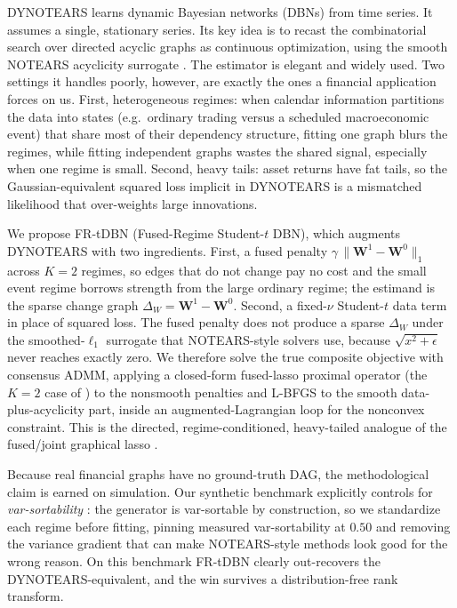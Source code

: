 \documentclass{article}
\newcommand{\W}{\bm{W}}
\newcommand{\Wd}{\Delta_{\!W}}
\begin{document}
DYNOTEARS \citep{pamfil2020dynotears} learns dynamic Bayesian networks (DBNs) from
time series. It assumes a single, stationary series. Its key idea is to recast the
combinatorial search over directed acyclic graphs as continuous optimization, using
the smooth NOTEARS acyclicity surrogate \citep{zheng2018notears}. The estimator is
elegant and widely used. Two settings it handles poorly, however, are exactly the
ones a financial application forces on us. First, heterogeneous regimes: when
calendar information partitions the data into states (e.g.\ ordinary trading versus
a scheduled macroeconomic event) that share most of their dependency structure,
fitting one graph blurs the regimes, while fitting independent graphs wastes the
shared signal, especially when one regime is small. Second, heavy tails: asset
returns have fat tails, so the Gaussian-equivalent squared loss implicit in
DYNOTEARS is a mismatched likelihood that over-weights large innovations.

We propose FR-tDBN (Fused-Regime Student-$t$ DBN), which augments DYNOTEARS with two
ingredients. First, a fused penalty $\gamma\,\|\W^{1}-\W^{0}\|_1$ across $K{=}2$
regimes, so edges that do not change pay no cost and the small event regime borrows
strength from the large ordinary regime; the estimand is the sparse change graph
$\Wd=\W^{1}-\W^{0}$. Second, a fixed-$\nu$ Student-$t$ data term in place of squared
loss. The fused penalty does not produce a sparse $\Wd$ under the smoothed-$\ell_1$
surrogate that NOTEARS-style solvers use, because $\sqrt{x^2+\epsilon}$ never reaches
exactly zero. We therefore solve the true composite objective with consensus ADMM,
applying a closed-form fused-lasso proximal operator (the $K{=}2$ case of
\citealp{friedman2007pathwise,danaher2014jgl}) to the nonsmooth penalties and L-BFGS
to the smooth data-plus-acyclicity part, inside an augmented-Lagrangian loop for the
nonconvex constraint. This is the directed, regime-conditioned, heavy-tailed analogue
of the fused/joint graphical lasso \citep{danaher2014jgl}.

Because real financial graphs have no ground-truth DAG, the methodological claim is
earned on simulation. Our synthetic benchmark explicitly controls for
\emph{var-sortability} \citep{reisach2021varsortability}: the generator is var-sortable
by construction, so we standardize each regime before fitting, pinning measured
var-sortability at $0.50$ and removing the variance gradient that can make NOTEARS-style
methods look good for the wrong reason. On this benchmark FR-tDBN clearly out-recovers
the DYNOTEARS-equivalent, and the win survives a distribution-free rank transform.
\end{document}
